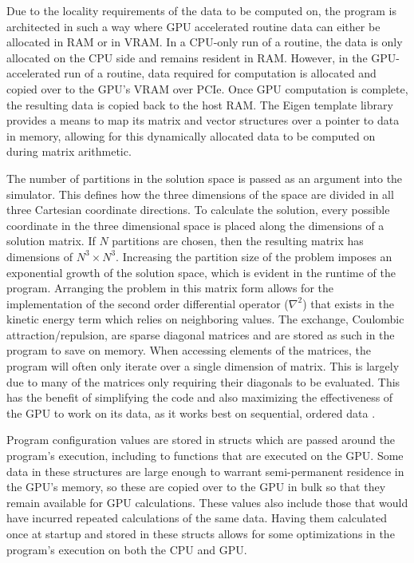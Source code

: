 \documentclass[conference, twoside]{IEEEtran}
\begin{document}
Due to the locality requirements of the data to be computed on, the program is architected in such a way where GPU accelerated routine data can either be allocated in RAM or in VRAM. In a CPU-only run of a routine, the data is only allocated on the CPU side and remains resident in RAM. However, in the GPU-accelerated run of a routine, data required for computation is allocated and copied over to the GPU's VRAM over PCIe. Once GPU computation is complete, the resulting data is copied back to the host RAM. The Eigen template library provides a means to map its matrix and vector structures over a pointer to data in memory, allowing for this dynamically allocated data to be computed on during matrix arithmetic.

The number of partitions in the solution space is passed as an argument into the simulator. This defines how the three dimensions of the space are divided in all three Cartesian coordinate directions. To calculate the solution, every possible coordinate in the three dimensional space is placed along the dimensions of a solution matrix. If $N$ partitions are chosen, then the resulting matrix has dimensions of $N^3 \times N^3$. Increasing the partition size of the problem imposes an exponential growth of the solution space, which is evident in the runtime of the program. Arranging the problem in this matrix form allows for the implementation of the second order differential operator ($\nabla^2$) that exists in the kinetic energy term which relies on neighboring values. The exchange, Coulombic attraction/repulsion, are sparse diagonal matrices and are stored as such in the program to save on memory. When accessing elements of the matrices, the program will often only iterate over a single dimension of matrix. This is largely due to many of the matrices only requiring their diagonals to be evaluated. This has the benefit of simplifying the code and also maximizing the effectiveness of the GPU to work on its data, as it works best on sequential, ordered data \cite{special-purpose-hf-computer}.

Program configuration values are stored in structs which are passed around the program's execution, including to functions that are executed on the GPU. Some data in these structures are large enough to warrant semi-permanent residence in the GPU's memory, so these are copied over to the GPU in bulk so that they remain available for GPU calculations. These values also include those that would have incurred repeated calculations of the same data. Having them calculated once at startup and stored in these structs allows for some optimizations in the program's execution on both the CPU and GPU.
\end{document}
